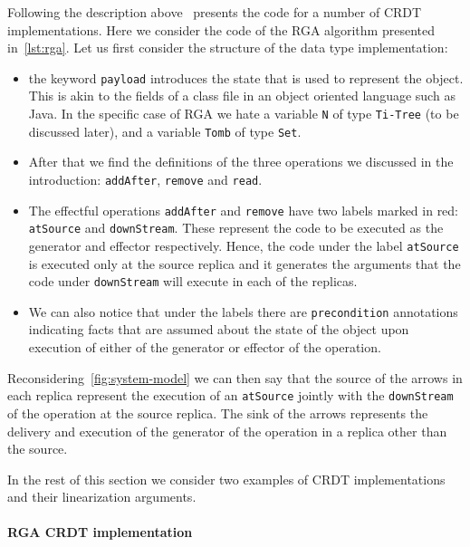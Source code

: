 Following the description above~\cite{ShapiroPBZ11} presents the code
for a number of CRDT implementations.
%
Here we consider the code of the RGA algorithm presented
in~\autoref{lst:rga}.
%
Let us first consider the structure of the data type implementation:
\begin{itemize}
\item the keyword \lstinline|payload| introduces the state that is
  used to represent the object. This is akin to the fields of a class
  file in an object oriented language such as Java. In the specific
  case of RGA we hate a variable \lstinline|N| of type
  \lstinline|Ti-Tree| (to be discussed later), and a variable
  \lstinline|Tomb| of type \lstinline|Set|.
\item After that we find the definitions of the three operations we
  discussed in the introduction: \lstinline|addAfter|,
  \lstinline|remove| and \lstinline|read|.
\item The effectful operations \lstinline|addAfter| and
  \lstinline|remove| have two labels marked in red:
  \lstinline|atSource| and \lstinline|downStream|.
  These represent the code to be executed as the generator and
  effector respectively. Hence, the code under the label
  \lstinline|atSource| is executed only at the source replica and it
  generates the arguments that the code under \lstinline|downStream|
  will execute in each of the replicas.
\item We can also notice that under the labels there are
  \lstinline|precondition| annotations indicating facts that are
  assumed about the state of the object upon execution of either of
  the generator or effector of the operation.
\end{itemize}
Reconsidering~\autoref{fig:system-model} we can then say that the
source of the arrows in each replica represent the execution of an
\lstinline|atSource| jointly with the \lstinline|downStream| of the
operation at the source replica.
%
The sink of the arrows represents the delivery and execution of the
generator of the operation in a replica other than the source.


In the rest of this section we consider two examples of CRDT
implementations  { and their linearization arguments.
}

\paragraph{RGA CRDT implementation}

